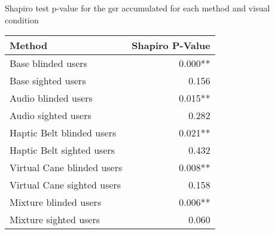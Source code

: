 
\centering
\caption{Shapiro test p-value for the gsr accumulated for each method and visual condition}
\label{tab:shapiro_gsr_sum}
\begin{tabular}{lr}
\toprule
                    Method & Shapiro P-Value \\
\midrule
        Base blinded users &         0.000** \\
        Base sighted users &           0.156 \\
       Audio blinded users &         0.015** \\
       Audio sighted users &           0.282 \\
 Haptic Belt blinded users &         0.021** \\
 Haptic Belt sighted users &           0.432 \\
Virtual Cane blinded users &         0.008** \\
Virtual Cane sighted users &           0.158 \\
     Mixture blinded users &         0.006** \\
     Mixture sighted users &           0.060 \\
\bottomrule
\end{tabular}
